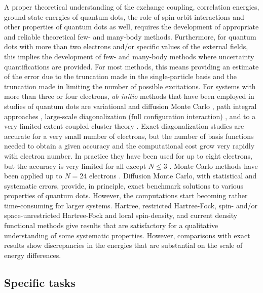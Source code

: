 \documentclass[twocolumn]{revtex4}
\begin{document}
A proper theoretical understanding of the exchange coupling, correlation energies, 
ground state energies of quantum dots, the role of spin-orbit interactions
and other properties of quantum dots as well, requires the development of appropriate and reliable  
theoretical  few- and many-body methods. 
Furthermore, for quantum dots with more than two electrons and/or specific values of the 
external fields, this implies the development of few- and many-body methods where   
uncertainty
quantifications are provided.  
For most methods, this means providing an estimate of the error due 
to the truncation made in the single-particle basis and the truncation made in 
limiting the number of possible excitations.
For systems with more than three or four electrons,  {\em ab initio} methods that have 
been employed in studies of quantum dots are
 variational and diffusion Monte Carlo \cite{harju2005,pederiva2001, pederiva2003}, path integral approaches \cite{pi1999}, 
large-scale diagonalization (full configuration 
interaction) \cite{Eto97,Maksym90,simen2008,modena2000}, and to a very limited extent 
coupled-cluster theory \cite{shavittbartlett2009,bartlett2007,bartlett2003,indians}. 
Exact diagonalization studies are accurate for a very small number
of electrons, but the number of basis functions needed to obtain a given
accuracy and the computational cost grow very rapidly with electron number.
In practice they have been used for up to eight electrons\cite{Eto97,Maksym90,modena2000}, but the accuracy is
very limited for all except $N\le 3$ .  
Monte Carlo methods have been applied up to $N=24$ electrons 
\cite{pederiva2001,pederiva2003}. Diffusion Monte Carlo, with statistical and systematic errors, provide, in principle,
exact benchmark solutions to various properties of quantum dots. However, 
the computations start becoming rather time-consuming for larger systems.   
Hartree\cite{Kum90}, restricted Hartree-Fock, spin- and/or space-unrestricted
Hartree-Fock\cite{Fuj96,Mul96,Yan99} and
local spin-density, and current density functional methods\cite{Kos97,Hir99,finns1,finns2}
give results that are satisfactory for a qualitative understanding of some
systematic properties. However, comparisons with exact results show
discrepancies in the energies that are substantial
on the scale of energy differences. 


\subsection*{Specific tasks}
\end{document}
